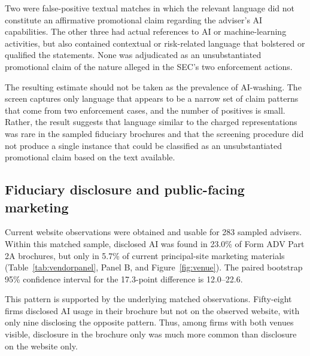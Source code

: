 \documentclass[utf8]{FrontiersinHarvard}
\begin{document}
Two were false-positive textual matches in which the relevant language did not constitute an affirmative promotional claim regarding the adviser's AI capabilities. The other three had actual references to AI or machine-learning activities, but also contained contextual or risk-related language that bolstered or qualified the statements. None was adjudicated as an unsubstantiated promotional claim of the nature alleged in the SEC's two enforcement actions.

The resulting estimate should not be taken as the prevalence of AI-washing. The screen captures only language that appears to be a narrow set of claim patterns that come from two enforcement cases, and the number of positives is small. Rather, the result suggests that language similar to the charged representations was rare in the sampled fiduciary brochures and that the screening procedure did not produce a single instance that could be classified as an unsubstantiated promotional claim based on the text available.

\subsection{Fiduciary disclosure and public-facing marketing}

Current website observations were obtained and usable for 283 sampled advisers. Within this matched sample, disclosed AI was found in 23.0\% of Form ADV Part 2A brochures, but only in 5.7\% of current principal-site marketing materials (Table~\ref{tab:vendorpanel}, Panel B, and Figure~\ref{fig:venue}). The paired bootstrap 95\% confidence interval for the 17.3-point difference is 12.0--22.6.

This pattern is supported by the underlying matched observations. Fifty-eight firms disclosed AI usage in their brochure but not on the observed website, with only nine disclosing the opposite pattern. Thus, among firms with both venues visible, disclosure in the brochure only was much more common than disclosure on the website only.
\end{document}
